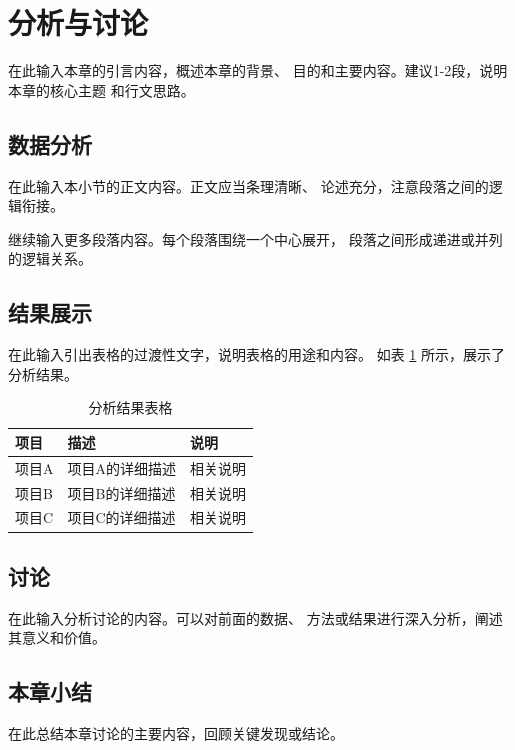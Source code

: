 
\section{分析与讨论}

在此输入本章的引言内容，概述本章的背景、
目的和主要内容。建议1-2段，说明本章的核心主题
和行文思路。

\subsection{数据分析}

在此输入本小节的正文内容。正文应当条理清晰、
论述充分，注意段落之间的逻辑衔接。

继续输入更多段落内容。每个段落围绕一个中心展开，
段落之间形成递进或并列的逻辑关系。

\subsection{结果展示}

在此输入引出表格的过渡性文字，说明表格的用途和内容。
如表 \ref{tab:analysis_table} 所示，展示了分析结果。

\begin{table}[H]
    \centering
    \caption{分析结果表格}
    \label{tab:analysis_table}
    \begin{tabularx}{0.95\textwidth}{l X X}
        \toprule
        项目 & 描述 & 说明 \\
        \midrule
        项目A & 项目A的详细描述 & 相关说明 \\
        项目B & 项目B的详细描述 & 相关说明 \\
        项目C & 项目C的详细描述 & 相关说明 \\
        \bottomrule
    \end{tabularx}
\end{table}

\subsection{讨论}

在此输入分析讨论的内容。可以对前面的数据、
方法或结果进行深入分析，阐述其意义和价值。

\subsection{本章小结}

在此总结本章讨论的主要内容，回顾关键发现或结论。
